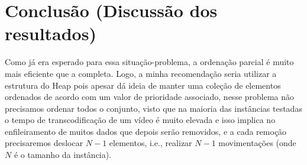\documentclass[12pt]{article}
\begin{document}
\newpage


\section{Conclusão (Discussão dos resultados)}

Como já era esperado para essa situação-problema, a ordenação parcial é muito mais eficiente que a completa. Logo, a minha recomendação seria utilizar a estrutura do Heap pois apesar dá ideia de manter uma coleção de elementos ordenados de acordo com um valor de prioridade associado, nesse problema não precisamos ordenar todos o conjunto, visto que na maioria das instâncias testadas o tempo de transcodificação de um vídeo é muito elevada e isso implica no enfileiramento de muitos dados que depois serão removidos, e a cada remoção precisaremos deslocar $N-1$ elementos, i.e., realizar $N-1$ movimentações (onde $N$ é o tamanho da instância).


%
%
\end{document}
